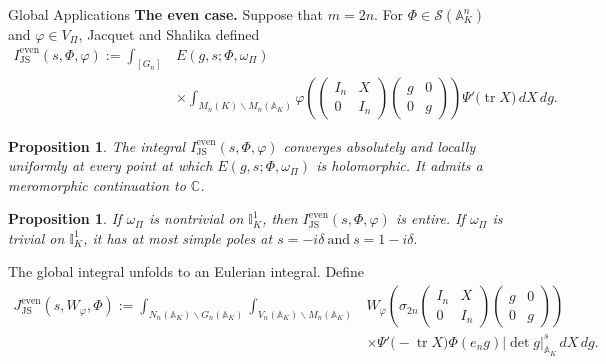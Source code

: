 \documentclass[12pt,reqno]{amsart}
\numberwithin{equation}{section}%
\numberwithin{equation}{subsection}
\newtheorem{prop}[equation]{Proposition}
\theoremstyle{definition}
\theoremstyle{remark}
\begin{document}
\begin{section}{Global Applications}
\medskip
\noindent\textbf{The even case.}
Suppose that \(m=2n\). For \(\Phi\in\mathcal{S}(\mathbb{A}_K^n)\) and
\(\varphi\in V_\Pi\), Jacquet and Shalika defined
\cite{JS1990}
\[
\begin{split}
  I_{\mathrm{JS}}^{\mathrm{even}}(s,\Phi,\varphi)
  :=
  \int_{[G_n]}
  &E(g,s;\Phi,\omega_\Pi)                                    \\
  &\times
  \int_{M_n(K)\backslash M_n(\mathbb{A}_K)}
  \varphi\left(
    \begin{pmatrix}
      I_n & X\\
      0   & I_n
    \end{pmatrix}
    \begin{pmatrix}
      g & 0\\
      0 & g
    \end{pmatrix}
  \right)
  \Psi'\bigl(\operatorname{tr}X\bigr)\,dX\,dg.
\end{split}
\]

\begin{prop}\label{prop:global-js-even-analytic}
The integral
\(I_{\mathrm{JS}}^{\mathrm{even}}(s,\Phi,\varphi)\)
converges absolutely and locally uniformly at every point at which
\(E(g,s;\Phi,\omega_\Pi)\) is holomorphic. It admits a meromorphic
continuation to \(\mathbb{C}\).
\end{prop}

\begin{prop}\label{prop:global-js-even-poles}
If \(\omega_\Pi\) is nontrivial on \(\mathbb{I}_K^1\), then
\(I_{\mathrm{JS}}^{\mathrm{even}}(s,\Phi,\varphi)\) is entire.
If \(\omega_\Pi\) is trivial on \(\mathbb{I}_K^1\), it has at most
simple poles at $s=-i\delta
  \>\text{and}\>
  s=1-i\delta.$
\end{prop}

The global integral unfolds to an Eulerian integral. Define
\[
\begin{split}
  J_{\mathrm{JS}}^{\mathrm{even}}
  (s,W_\varphi,\Phi)
  :=
  \int_{N_n(\mathbb{A}_K)\backslash G_n(\mathbb{A}_K)}
  \int_{V_n(\mathbb{A}_K)\backslash M_n(\mathbb{A}_K)}
  &W_\varphi\left(
    \sigma_{2n}
    \begin{pmatrix}
      I_n & X\\
      0   & I_n
    \end{pmatrix}
    \begin{pmatrix}
      g & 0\\
      0 & g
    \end{pmatrix}
  \right)                                                     \\
  &\times
  \Psi'\bigl(-\operatorname{tr}X\bigr)
  \Phi(e_ng)
  |\det g|_{\mathbb{A}_K}^{s}\,dX\,dg.
\end{split}
\]


\end{section}
\end{document}
